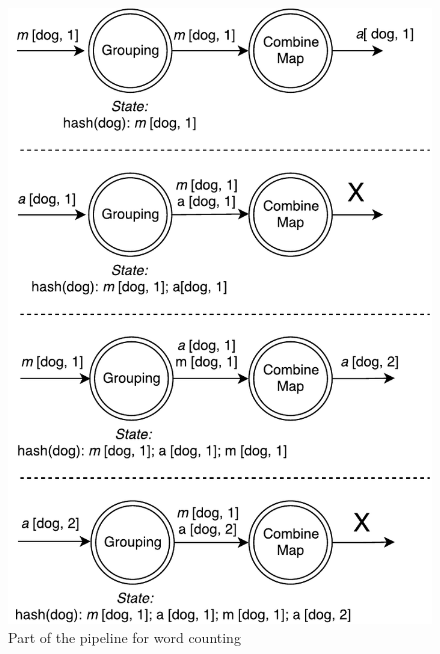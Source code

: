 \begin{figure}[htb]
  \centering
  \includegraphics[scale=0.5]{pics/wordcount}
  \caption{Part of the pipeline for word counting}
  \label {word-count-figure}
\end{figure}
